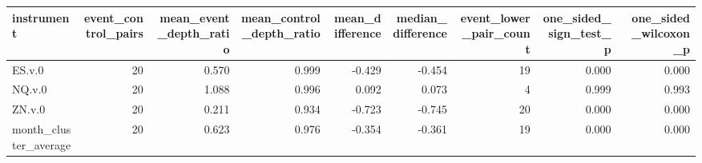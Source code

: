 \begin{tabular}{lrrrrrrrr}
\toprule
instrument & event_control_pairs & mean_event_depth_ratio & mean_control_depth_ratio & mean_difference & median_difference & event_lower_pair_count & one_sided_sign_test_p & one_sided_wilcoxon_p \\
\midrule
ES.v.0 & 20 & 0.570 & 0.999 & -0.429 & -0.454 & 19 & 0.000 & 0.000 \\
NQ.v.0 & 20 & 1.088 & 0.996 & 0.092 & 0.073 & 4 & 0.999 & 0.993 \\
ZN.v.0 & 20 & 0.211 & 0.934 & -0.723 & -0.745 & 20 & 0.000 & 0.000 \\
month_cluster_average & 20 & 0.623 & 0.976 & -0.354 & -0.361 & 19 & 0.000 & 0.000 \\
\bottomrule
\end{tabular}
